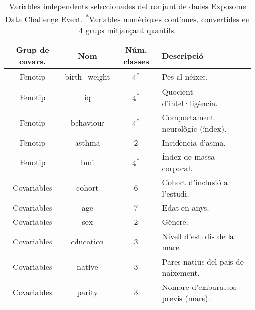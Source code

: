 \documentclass[CAT,BIB]{TFUOC}%
\begin{document}
            \begin{table}[h]
                \small
                \centering
                \begin{tabular}{@{}cccl@{}}
                    \toprule
                    \textbf{Grup de covars.}
                    & \textbf{Nom}
                    & \textbf{Núm. classes}
                    & \textbf{Descripció}  \\ \midrule
                    Fenotip     & birth\_weight & 4\textsuperscript{*} & Pes al néixer.                      \\
                    Fenotip     & iq            & 4\textsuperscript{*} & Quocient d'intel·ligència.          \\
                    Fenotip     & behaviour     & 4\textsuperscript{*} & Comportament neurològic (índex).    \\
                    Fenotip     & asthma        & 2                    & Incidència d'asma.                  \\
                    Fenotip     & bmi           & 4\textsuperscript{*} & Índex de massa corporal.            \\
                    Covariables & cohort        & 6                    & Cohort d'inclusió a l'estudi.       \\
                    Covariables & age           & 7                    & Edat en anys.                       \\
                    Covariables & sex           & 2                    & Gènere.                             \\
                    Covariables & education     & 3                    & Nivell d'estudis de la mare.        \\
                    Covariables & native        & 3                    & Pares natius del país de naixement. \\
                    Covariables & parity        & 3                    & Nombre d'embarassos previs (mare).  \\ \bottomrule
                \end{tabular}
                \caption[Exposome Data Challenge Event: covariables seleccionades]{
                    Variables independents seleccionades del conjunt de dades Exposome Data Challenge Event.
                    \newline \textsuperscript{*}Variables numèriques contínues,
                    convertides en 4 grups mitjançant quantils.}
                \label{t:exposome_vars}
            \end{table}
\end{document}
